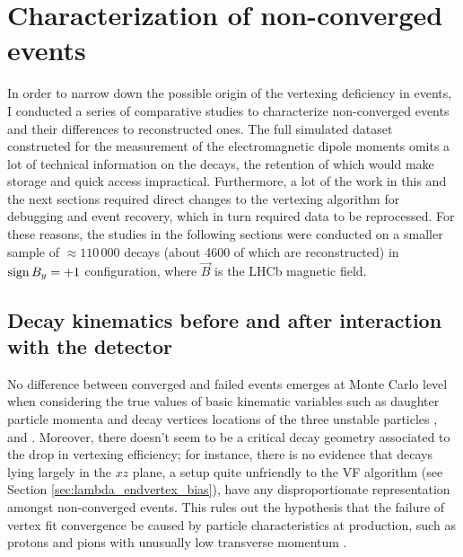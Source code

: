 \section{Characterization of non-converged events}
\label{sec:characterization_non_converged}
In order to narrow down the possible origin of the vertexing deficiency in \lambdadecay events, I conducted a series of comparative studies to characterize non-converged events and their differences to reconstructed ones.
The full simulated \demonstratorshort dataset constructed for the measurement of the \lz electromagnetic dipole moments omits a lot of technical information on the decays, the retention of which would make storage and quick access impractical.
Furthermore, a lot of the work in this and the next sections required direct changes to the vertexing algorithm for debugging and event recovery, which in turn required data to be reprocessed.
For these reasons, the studies in the following sections were conducted on a smaller sample of $\approx 110\,000$ \lbz decays (about 4600 of which are reconstructed) in $\operatorname{sign}{B_y} = +1$ configuration, where $\vec{B}$ is the LHCb magnetic field.

\subsection{Decay kinematics before and after interaction with the detector}
\label{sec:3:kinematics_at_first_meas}
No difference between converged and failed \demonstratorshort events emerges at Monte Carlo level when considering the true values of basic kinematic variables such as daughter particle momenta and decay vertices locations of the three unstable particles \lbz, \lz and \jpsi.
Moreover, there doesn't seem to be a critical decay geometry associated to the drop in vertexing efficiency;
for instance, there is no evidence that \lambdadecay decays lying largely in the $xz$ plane, a setup quite unfriendly to the VF algorithm (see Section \ref{sec:lambda_endvertex_bias}), have any disproportionate representation amongst non-converged events.
This rules out the hypothesis that the failure of vertex fit convergence be caused by particle characteristics at production, such as protons and pions with unusually low transverse momentum \pt.

